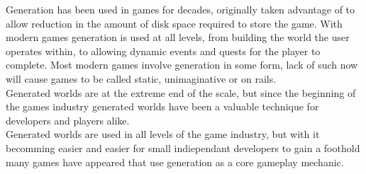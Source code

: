 Generation has been used in games for decades, originally taken advantage
of to allow reduction in the amount of disk space required to store the game.
With modern games generation is used at all levels, from building the world the
user operates within, to allowing dynamic events and quests for the player to
complete. Most modern games involve generation in some form, lack of such now 
will cause games to be called static, unimaginative or on rails.\\

Generated worlds are at the extreme end of the scale, but since the beginning of
the games industry generated worlds have been a valuable technique for developers
and players alike.\\ 

Generated worlds are used in all levels of the game industry, but with it
becomming easier and easier for small indiependant developers to gain a foothold
many games have appeared that use generation as a core gameplay mechanic.\\
